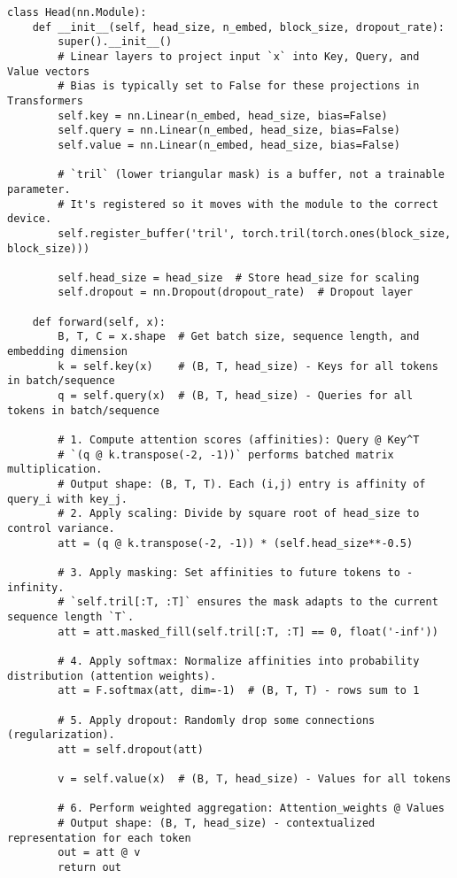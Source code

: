 \begin{lstlisting}[caption={Single Self-Attention Head implementation}]
class Head(nn.Module):
    def __init__(self, head_size, n_embed, block_size, dropout_rate):
        super().__init__()
        # Linear layers to project input `x` into Key, Query, and Value vectors
        # Bias is typically set to False for these projections in Transformers
        self.key = nn.Linear(n_embed, head_size, bias=False)
        self.query = nn.Linear(n_embed, head_size, bias=False)
        self.value = nn.Linear(n_embed, head_size, bias=False)
        
        # `tril` (lower triangular mask) is a buffer, not a trainable parameter.
        # It's registered so it moves with the module to the correct device.
        self.register_buffer('tril', torch.tril(torch.ones(block_size, block_size)))
        
        self.head_size = head_size  # Store head_size for scaling
        self.dropout = nn.Dropout(dropout_rate)  # Dropout layer

    def forward(self, x):
        B, T, C = x.shape  # Get batch size, sequence length, and embedding dimension
        k = self.key(x)    # (B, T, head_size) - Keys for all tokens in batch/sequence
        q = self.query(x)  # (B, T, head_size) - Queries for all tokens in batch/sequence
        
        # 1. Compute attention scores (affinities): Query @ Key^T
        # `(q @ k.transpose(-2, -1))` performs batched matrix multiplication.
        # Output shape: (B, T, T). Each (i,j) entry is affinity of query_i with key_j.
        # 2. Apply scaling: Divide by square root of head_size to control variance.
        att = (q @ k.transpose(-2, -1)) * (self.head_size**-0.5) 
        
        # 3. Apply masking: Set affinities to future tokens to -infinity.
        # `self.tril[:T, :T]` ensures the mask adapts to the current sequence length `T`.
        att = att.masked_fill(self.tril[:T, :T] == 0, float('-inf')) 
        
        # 4. Apply softmax: Normalize affinities into probability distribution (attention weights).
        att = F.softmax(att, dim=-1)  # (B, T, T) - rows sum to 1
        
        # 5. Apply dropout: Randomly drop some connections (regularization).
        att = self.dropout(att)

        v = self.value(x)  # (B, T, head_size) - Values for all tokens
        
        # 6. Perform weighted aggregation: Attention_weights @ Values
        # Output shape: (B, T, head_size) - contextualized representation for each token
        out = att @ v 
        return out
\end{lstlisting}

